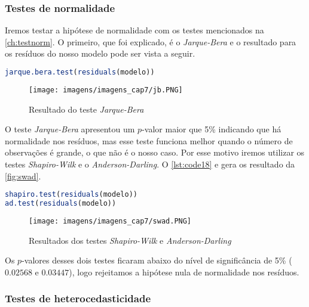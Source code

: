 \subsubsection{Testes de normalidade}

\noindent Iremos testar a hipótese de normalidade com os testes mencionados na \autoref{ch:testnorm}. O primeiro, que foi explicado, é o \textit{Jarque-Bera} e o resultado para os resíduos do nosso modelo pode ser vista a seguir.

\begin{lstlisting}[language=R, caption = {Teste \textit{Jarque-Bera}},label={lst:code17}]
jarque.bera.test(residuals(modelo))
\end{lstlisting}

\begin{figure}[H]
\centering
\caption{Resultado do teste \textit{Jarque-Bera}}
\texttt{[image: imagens/imagens\_cap7/jb.PNG]}
\label{fig:jb}
\end{figure}

\noindent O teste \textit{Jarque-Bera} apresentou um $p$-valor maior que 5\% indicando que há normalidade nos resíduos, mas esse teste funciona melhor quando o número de observações é grande, o que não é o nosso caso. Por esse motivo iremos utilizar os testes \textit{Shapiro-Wilk} e o \textit{Anderson-Darling}. O \autoref{lst:code18} e gera os resultado da \autoref{fig:swad}.


\begin{lstlisting}[language=R, caption = {Testes \textit{Shapiro-Wilk} e \textit{Anderson-Darling}},label={lst:code18}]
shapiro.test(residuals(modelo))
ad.test(residuals(modelo))
\end{lstlisting}

\begin{figure}[H]
\centering
\caption{Resultados dos testes \textit{Shapiro-Wilk} e \textit{Anderson-Darling}}
\texttt{[image: imagens/imagens\_cap7/swad.PNG]}
\label{fig:swad}
\end{figure}

\noindent Os $p$-valores desses dois testes ficaram abaixo do nível de significância de 5\% ($0.02568$ e $0.03447$), logo rejeitamos a hipótese nula de normalidade nos resíduos. 

\newpage

\subsubsection{Testes de heterocedasticidade}

